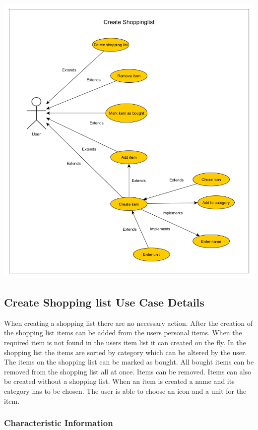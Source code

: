 \documentclass[12pt]{article}
\theoremstyle{definition}
\begin{document}
\includegraphics[scale=.5]{UseCaseCreateShoppinglist.png}\\

\subsection{Create Shopping list Use Case Details}

When creating a shopping list there are no necessary action. After the creation of the shopping list items can be added from the users personal items. When the required item is not found in the users item list it can created on the fly. In the shopping list the items are sorted by category which can be altered by the user. The items on the shopping list can be marked as bought. All bought items can be removed from the shopping list all at once. Items can be removed. Items can also be created without a shopping list. When an item is created a name and its category has to be chosen. The user is able to choose an icon and a unit for the item.
\pagebreak
\subsubsection{Characteristic Information}
\end{document}
